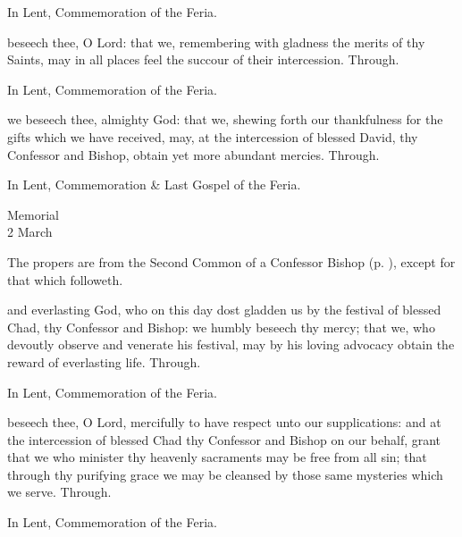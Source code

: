 \begin{rubric}
	In Lent, Commemoration of the Feria.
\end{rubric}

\secret
{} beseech thee, O Lord: that we, remembering with gladness the merits of thy Saints, may in all places feel the succour of their intercession. Through.

\begin{rubric}
	In Lent, Commemoration of the Feria.
\end{rubric}

\postcommunion
{} we beseech thee, almighty God: that we, shewing forth our thankfulness for the gifts which we have received, may, at the intercession of blessed David, thy Confessor and Bishop, obtain yet more abundant mercies. Through.

\begin{rubric}
	In Lent, Commemoration \& Last Gospel of the Feria.
\end{rubric}


\begin{inhead}
    {Memorial\\
2 March}
\end{inhead}

\begin{rubric}
	The propers are from the Second Common of a Confessor Bishop (p. \pageref{CommonConfessorBishopII}), except for that which followeth.
\end{rubric}

\collect
{} and everlasting God, who on this day dost gladden us by the festival of blessed Chad, thy Confessor and Bishop: we humbly beseech thy mercy; that we, who devoutly observe and venerate his festival, may by his loving advocacy obtain the reward of everlasting life. Through.

\begin{rubric}
	In Lent, Commemoration of the Feria.
\end{rubric}

\secret
{} beseech thee, O Lord, mercifully to have respect unto our supplications: and at the intercession of blessed Chad thy Confessor and Bishop on our behalf, grant that we who minister thy heavenly sacraments may be free from all sin; that through thy purifying grace we may be cleansed by those same mysteries which we serve. Through.

\begin{rubric}
	In Lent, Commemoration of the Feria.
\end{rubric}

